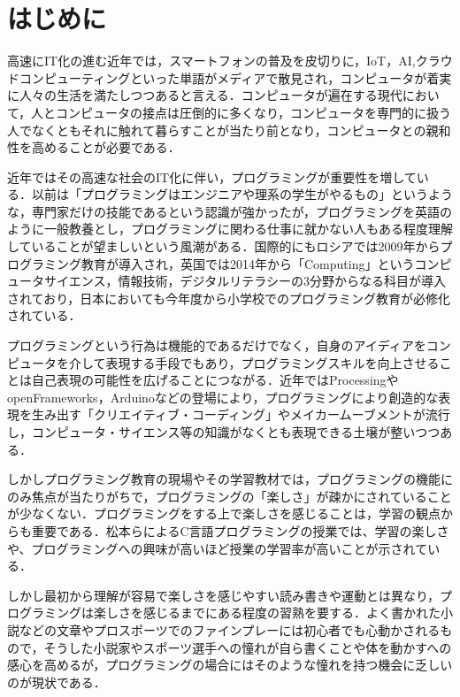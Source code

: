 \section{はじめに}

高速にIT化の進む近年では，スマートフォンの普及を皮切りに，IoT，AI,クラウドコンピューティングといった単語がメディアで散見され，コンピュータが着実に人々の生活を満たしつつあると言える．コンピュータが遍在する現代において，人とコンピュータの接点は圧倒的に多くなり，コンピュータを専門的に扱う人でなくともそれに触れて暮らすことが当たり前となり，コンピュータとの親和性を高めることが必要である．

近年ではその高速な社会のIT化に伴い，プログラミングが重要性を増している．以前は「プログラミングはエンジニアや理系の学生がやるもの」というような，専門家だけの技能であるという認識が強かったが，プログラミングを英語のように一般教養とし，プログラミングに関わる仕事に就かない人もある程度理解していることが望ましいという風潮がある．国際的にもロシアでは2009年からプログラミング教育が導入され，英国では2014年から「Computing」というコンピュータサイエンス，情報技術，デジタルリテラシーの3分野からなる科目が導入されており\cite{survey}，日本においても今年度から小学校でのプログラミング教育が必修化されている\cite{guide}．


プログラミングという行為は機能的であるだけでなく，自身のアイディアをコンピュータを介して表現する手段でもあり，プログラミングスキルを向上させることは自己表現の可能性を広げることにつながる．近年ではProcessingやopenFrameworks，Arduinoなどの登場により，プログラミングにより創造的な表現を生み出す「クリエイティブ・コーディング」やメイカームーブメントが流行し，コンピュータ・サイエンス等の知識がなくとも表現できる土壌が整いつつある．

しかしプログラミング教育の現場やその学習教材では，プログラミングの機能にのみ焦点が当たりがちで，プログラミングの「楽しさ」が疎かにされていることが少なくない．プログラミングをする上で楽しさを感じることは，学習の観点からも重要である．松本らによるC言語プログラミングの授業では、学習の楽しさや、プログラミングへの興味が高いほど授業の学習率が高いことが示されている\cite{matsumoto}．

しかし最初から理解が容易で楽しさを感じやすい読み書きや運動とは異なり，プログラミングは楽しさを感じるまでにある程度の習熟を要する．よく書かれた小説などの文章やプロスポーツでのファインプレーには初心者でも心動かされるもので，そうした小説家やスポーツ選手への憧れが自ら書くことや体を動かすへの感心を高めるが，プログラミングの場合にはそのような憧れを持つ機会に乏しいのが現状である．

